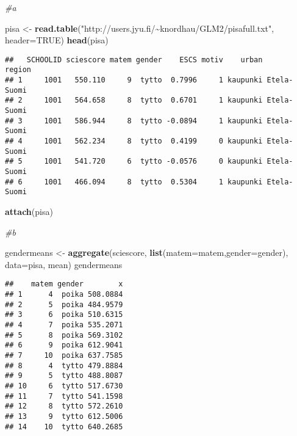\documentclass[
]{article}
\newenvironment{Shaded}{\begin{snugshade}}{\end{snugshade}}
\newcommand{\AttributeTok}[1]{\textcolor[rgb]{0.13,0.29,0.53}{#1}}
\newcommand{\CommentTok}[1]{\textcolor[rgb]{0.56,0.35,0.01}{\textit{#1}}}
\newcommand{\ConstantTok}[1]{\textcolor[rgb]{0.56,0.35,0.01}{#1}}
\newcommand{\FunctionTok}[1]{\textcolor[rgb]{0.13,0.29,0.53}{\textbf{#1}}}
\newcommand{\NormalTok}[1]{#1}
\newcommand{\OtherTok}[1]{\textcolor[rgb]{0.56,0.35,0.01}{#1}}
\newcommand{\SpecialCharTok}[1]{\textcolor[rgb]{0.81,0.36,0.00}{\textbf{#1}}}
\newcommand{\StringTok}[1]{\textcolor[rgb]{0.31,0.60,0.02}{#1}}
\begin{document}
\begin{Shaded}
\begin{Highlighting}[]
\CommentTok{\#a}

\NormalTok{pisa }\OtherTok{\textless{}{-}} \FunctionTok{read.table}\NormalTok{(}\StringTok{"http://users.jyu.fi/\textasciitilde{}knordhau/GLM2/pisafull.txt"}\NormalTok{, }\AttributeTok{header=}\ConstantTok{TRUE}\NormalTok{)}
\FunctionTok{head}\NormalTok{(pisa)}
\end{Highlighting}
\end{Shaded}

\begin{verbatim}
##   SCHOOLID sciescore matem gender    ESCS motiv    urban      region
## 1     1001   550.110     9  tytto  0.7996     1 kaupunki Etela-Suomi
## 2     1001   564.658     8  tytto  0.6701     1 kaupunki Etela-Suomi
## 3     1001   586.944     8  tytto -0.0894     1 kaupunki Etela-Suomi
## 4     1001   562.234     8  tytto  0.4199     0 kaupunki Etela-Suomi
## 5     1001   541.720     6  tytto -0.0576     0 kaupunki Etela-Suomi
## 6     1001   466.094     8  tytto  0.5304     1 kaupunki Etela-Suomi
\end{verbatim}

\begin{Shaded}
\begin{Highlighting}[]
\FunctionTok{attach}\NormalTok{(pisa)}

\CommentTok{\#b}

\NormalTok{gendermeans }\OtherTok{\textless{}{-}} \FunctionTok{aggregate}\NormalTok{(sciescore, }\FunctionTok{list}\NormalTok{(}\AttributeTok{matem=}\NormalTok{matem,}\AttributeTok{gender=}\NormalTok{gender), }\AttributeTok{data=}\NormalTok{pisa, mean)}
\NormalTok{gendermeans}
\end{Highlighting}
\end{Shaded}

\begin{verbatim}
##    matem gender        x
## 1      4  poika 508.0884
## 2      5  poika 484.9579
## 3      6  poika 510.6315
## 4      7  poika 535.2071
## 5      8  poika 569.3102
## 6      9  poika 612.9041
## 7     10  poika 637.7585
## 8      4  tytto 479.8884
## 9      5  tytto 488.8087
## 10     6  tytto 517.6730
## 11     7  tytto 541.1598
## 12     8  tytto 572.2610
## 13     9  tytto 612.5006
## 14    10  tytto 640.2685
\end{verbatim}

\begin{Shaded}
\end{Shaded}
\end{document}
